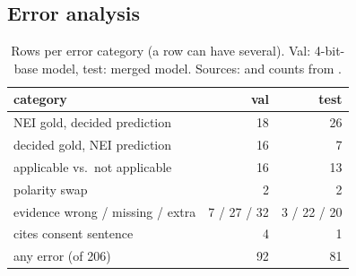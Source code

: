 \documentclass[conference]{IEEEtran}
\begin{document}
\subsection{Error analysis}
\begin{table}[t]
\caption{Rows per error category (a row can have several). Val: 4-bit-base model, test: merged model. Sources: \protect{} and counts from \protect{}.}\label{tab:errcat}
\centering\footnotesize\setlength{\tabcolsep}{3pt}
\begin{tabular}{lrr}
\toprule
category & val & test\\
\midrule
NEI gold, decided prediction & 18 & 26\\
decided gold, NEI prediction & 16 & 7\\
applicable vs.\ not applicable & 16 & 13\\
polarity swap & 2 & 2\\
evidence wrong / missing / extra & 7 / 27 / 32 & 3 / 22 / 20\\
cites consent sentence & 4 & 1\\
any error (of 206) & 92 & 81\\
\bottomrule
\end{tabular}
\end{table}
\end{document}
